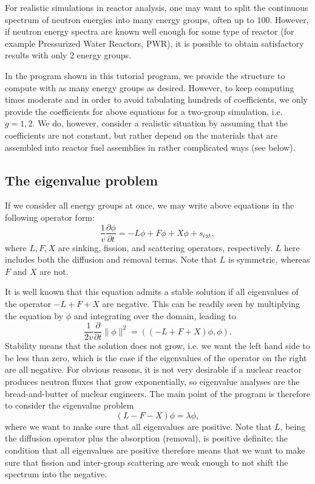 \documentclass{article}
\begin{document}
For realistic simulations in reactor analysis, one may want to split the
continuous spectrum of neutron energies into many energy groups, often up to
100. However, if neutron energy spectra are known well enough for some type of
reactor (for example Pressurized Water Reactors, PWR), it is possible to obtain
satisfactory results with only 2 energy groups. 

In the program shown in this tutorial program, we provide the structure to
compute with as many energy groups as desired. However, to keep computing
times moderate and in order to avoid tabulating hundreds of coefficients, we
only provide the coefficients for above equations for a two-group simulation,
i.e. $g=1,2$. We do, however, consider a realistic situation by assuming that
the coefficients are not constant, but rather depend on the materials that are
assembled into reactor fuel assemblies in rather complicated ways (see
below). 


\subsection{The eigenvalue problem}

If we consider all energy groups at once, we may write above equations in the
following operator form:
\begin{equation}
\frac 1v \frac{\partial \phi}{\partial t}
=
-L\phi
+
F\phi
+
X\phi
+
s_{\mathrm{ext}},
\end{equation}
where $L,F,X$ are sinking, fission, and scattering operators,
respectively. $L$ here includes both the diffusion and removal terms. Note
that $L$ is symmetric, whereas $F$ and $X$ are not.

It is well known that this equation admits a stable solution if all
eigenvalues of the operator $-L+F+X$ are negative. This can be readily seen by
multiplying the equation by $\phi$ and integrating over the domain, leading to
\begin{equation}
  \frac 1{2v} \frac{\partial}{\partial t}  \|\phi\|^2 = ((-L+F+X)\phi,\phi).
\end{equation}
Stability means that the solution does not grow, i.e. we want the left hand
side to be less than zero, which is the case if the eigenvalues of the
operator on the right are all negative. For obvious reasons, it is
not very desirable if a nuclear reactor produces neutron fluxes that grow
exponentially, so eigenvalue analyses are the bread-and-butter of nuclear
engineers. The main point of the program is therefore to consider the
eigenvalue problem
\begin{equation}
  (L-F-X) \phi = \lambda \phi,
\end{equation}
where we want to make sure that all eigenvalues are positive. Note that $L$,
being the diffusion operator plus the absorption (removal), is positive
definite; the condition that all eigenvalues are positive therefore means that
we want to make sure that fission and inter-group scattering are weak enough
to not shift the spectrum into the negative.
\end{document}
